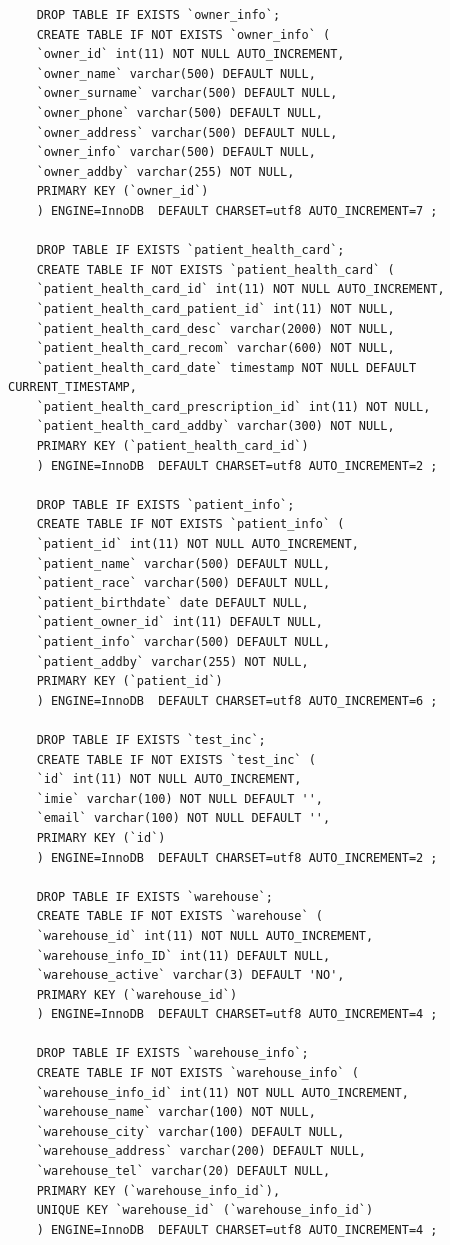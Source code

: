 \documentclass[10pt,a4paper]{article}
\begin{document}
\begin{lstlisting}
	DROP TABLE IF EXISTS `owner_info`;
	CREATE TABLE IF NOT EXISTS `owner_info` (
	`owner_id` int(11) NOT NULL AUTO_INCREMENT,
	`owner_name` varchar(500) DEFAULT NULL,
	`owner_surname` varchar(500) DEFAULT NULL,
	`owner_phone` varchar(500) DEFAULT NULL,
	`owner_address` varchar(500) DEFAULT NULL,
	`owner_info` varchar(500) DEFAULT NULL,
	`owner_addby` varchar(255) NOT NULL,
	PRIMARY KEY (`owner_id`)
	) ENGINE=InnoDB  DEFAULT CHARSET=utf8 AUTO_INCREMENT=7 ;
	
	DROP TABLE IF EXISTS `patient_health_card`;
	CREATE TABLE IF NOT EXISTS `patient_health_card` (
	`patient_health_card_id` int(11) NOT NULL AUTO_INCREMENT,
	`patient_health_card_patient_id` int(11) NOT NULL,
	`patient_health_card_desc` varchar(2000) NOT NULL,
	`patient_health_card_recom` varchar(600) NOT NULL,
	`patient_health_card_date` timestamp NOT NULL DEFAULT CURRENT_TIMESTAMP,
	`patient_health_card_prescription_id` int(11) NOT NULL,
	`patient_health_card_addby` varchar(300) NOT NULL,
	PRIMARY KEY (`patient_health_card_id`)
	) ENGINE=InnoDB  DEFAULT CHARSET=utf8 AUTO_INCREMENT=2 ;
	
	DROP TABLE IF EXISTS `patient_info`;
	CREATE TABLE IF NOT EXISTS `patient_info` (
	`patient_id` int(11) NOT NULL AUTO_INCREMENT,
	`patient_name` varchar(500) DEFAULT NULL,
	`patient_race` varchar(500) DEFAULT NULL,
	`patient_birthdate` date DEFAULT NULL,
	`patient_owner_id` int(11) DEFAULT NULL,
	`patient_info` varchar(500) DEFAULT NULL,
	`patient_addby` varchar(255) NOT NULL,
	PRIMARY KEY (`patient_id`)
	) ENGINE=InnoDB  DEFAULT CHARSET=utf8 AUTO_INCREMENT=6 ;
	
	DROP TABLE IF EXISTS `test_inc`;
	CREATE TABLE IF NOT EXISTS `test_inc` (
	`id` int(11) NOT NULL AUTO_INCREMENT,
	`imie` varchar(100) NOT NULL DEFAULT '',
	`email` varchar(100) NOT NULL DEFAULT '',
	PRIMARY KEY (`id`)
	) ENGINE=InnoDB  DEFAULT CHARSET=utf8 AUTO_INCREMENT=2 ;
	
	DROP TABLE IF EXISTS `warehouse`;
	CREATE TABLE IF NOT EXISTS `warehouse` (
	`warehouse_id` int(11) NOT NULL AUTO_INCREMENT,
	`warehouse_info_ID` int(11) DEFAULT NULL,
	`warehouse_active` varchar(3) DEFAULT 'NO',
	PRIMARY KEY (`warehouse_id`)
	) ENGINE=InnoDB  DEFAULT CHARSET=utf8 AUTO_INCREMENT=4 ;
	
	DROP TABLE IF EXISTS `warehouse_info`;
	CREATE TABLE IF NOT EXISTS `warehouse_info` (
	`warehouse_info_id` int(11) NOT NULL AUTO_INCREMENT,
	`warehouse_name` varchar(100) NOT NULL,
	`warehouse_city` varchar(100) DEFAULT NULL,
	`warehouse_address` varchar(200) DEFAULT NULL,
	`warehouse_tel` varchar(20) DEFAULT NULL,
	PRIMARY KEY (`warehouse_info_id`),
	UNIQUE KEY `warehouse_id` (`warehouse_info_id`)
	) ENGINE=InnoDB  DEFAULT CHARSET=utf8 AUTO_INCREMENT=4 ;
	

\end{lstlisting}
\end{document}
